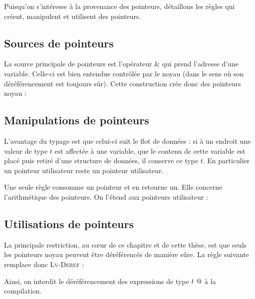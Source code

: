 Puisqu'on s'intéresse à la provenance des pointeurs, détaillons les règles qui
créent, manipulent et utilisent des pointeurs.

\subsection*{Sources de pointeurs}

La source principale de pointeurs est l'opérateur $\&$ qui prend l'adresse d'une
variable. Celle-ci est bien entendue contrôlée par le noyau (dans le sens où son
déréférencement est toujours sûr). Cette construction crée donc des pointeurs
noyau :

\begin{mathpar}
\end{mathpar}

\subsection*{Manipulations de pointeurs}

L'avantage du typage est que celui-ci suit le flot de données : si à un endroit
une valeur de type $t$ est affectée à une variable, que le contenu de cette
variable est placé puis retiré d'une structure de données, il conserve ce type
$t$. En particulier un pointeur utilisateur reste un pointeur utilisateur.

Une seule règle consomme un pointeur et en retourne un. Elle concerne
l'arithmétique des pointeurs. On l'étend aux pointeurs utilisateur :

\begin{mathpar}
\end{mathpar}

\subsection*{Utilisations de pointeurs}

La principale restriction, au cœur de ce chapitre et de cette thèse, est que
seuls les pointeurs noyau peuvent être déréférencés de manière sûre. La règle
suivante remplace donc \textsc{Lv-Deref} :

\begin{mathpar}
\end{mathpar}

Ainsi, on interdit le déréférencement des expressions de type $\ptrU{t}$ à la
compilation.

